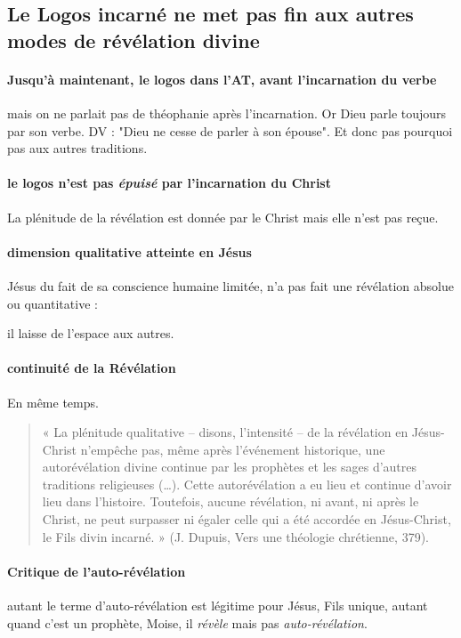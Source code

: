 \subsection{Le Logos incarné ne met pas fin aux autres modes de révélation divine}

 \paragraph{Jusqu'à maintenant, le logos dans l'AT, avant l'incarnation du verbe} mais on ne parlait pas de théophanie après l'incarnation. Or Dieu parle toujours par son verbe. DV : "Dieu ne cesse de parler à son épouse". Et donc pas pourquoi pas aux autres traditions. 

 \paragraph{le logos n'est pas \textit{épuisé} par l'incarnation du Christ} La plénitude de la révélation est donnée par le Christ mais elle n'est pas reçue. 

\paragraph{dimension qualitative atteinte en Jésus} Jésus du fait de sa conscience humaine limitée, n'a pas fait une révélation absolue ou quantitative : 


il laisse de l'espace aux autres.




\paragraph{continuité de la Révélation} En même temps.

 \begin{quote}
     « La plénitude qualitative – disons, l’intensité – de la révélation en Jésus-Christ n’empêche pas, même
après l’événement historique, une autorévélation divine continue par les prophètes et les sages d’autres
traditions religieuses (…). Cette autorévélation a eu lieu et continue d’avoir lieu dans l’histoire.
Toutefois, aucune révélation, ni avant, ni après le Christ, ne peut surpasser ni égaler celle qui a été
accordée en Jésus-Christ, le Fils divin incarné. » (J. Dupuis, Vers une théologie chrétienne, 379).
 \end{quote}

\paragraph{Critique de l'auto-révélation} autant le terme d'auto-révélation est légitime pour Jésus, Fils unique, autant quand c'est un prophète, Moise, il \textit{révèle} mais pas \textit{auto-révélation}.

